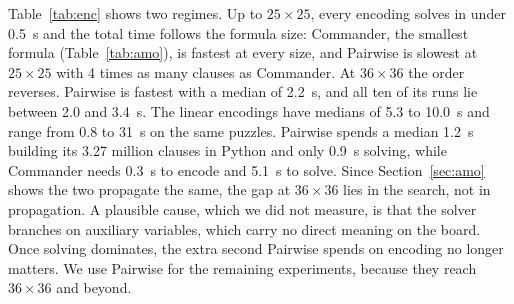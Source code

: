 Table~\ref{tab:enc} shows two regimes. Up to $25\times25$, every encoding solves in under 0.5~s and the total time follows the formula size: Commander, the smallest formula (Table~\ref{tab:amo}), is fastest at every size, and Pairwise is slowest at $25\times25$ with 4 times as many clauses as Commander. At $36\times36$ the order reverses. Pairwise is fastest with a median of 2.2~s, and all ten of its runs lie between 2.0 and 3.4~s. The linear encodings have medians of 5.3 to 10.0~s and range from 0.8 to 31~s on the same puzzles. Pairwise spends a median 1.2~s building its 3.27 million clauses in Python and only 0.9~s solving, while Commander needs 0.3~s to encode and 5.1~s to solve. Since Section~\ref{sec:amo} shows the two propagate the same, the gap at $36\times36$ lies in the search, not in propagation. A plausible cause, which we did not measure, is that the solver branches on auxiliary variables, which carry no direct meaning on the board. Once solving dominates, the extra second Pairwise spends on encoding no longer matters. We use Pairwise for the remaining experiments, because they reach $36\times36$ and beyond.


